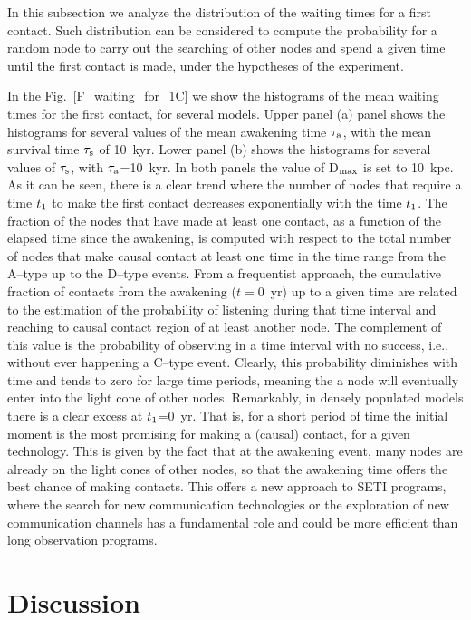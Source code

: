 \documentclass[crop]{CSLB}
\newcommand{\ceti}{node}
\newcommand{\cetis}{nodes}
\newcommand{\ffn}[1]{}
\begin{document}
In this subsection we analyze the distribution of the waiting times for
a first contact.
%
Such distribution can be considered to compute the probability for a
random \ceti{} to carry out the searching of other nodes and spend a given time until
the first contact is made, under the hypotheses of the experiment.
%
\ffn{6}
%
In the Fig.~\ref{F_waiting_for_1C} we show the histograms of the mean
waiting times for the first contact, for several models.
%
Upper panel (a) panel shows the histograms for several values of the
mean awakening time $\tau_{\rm a}$, with the mean survival time $\tau_{\rm
s}$ of 10~kyr.
%
Lower panel (b) shows the histograms for several values of $\tau_{\rm s}$,
with $\tau_{\rm a}$=10~kyr.
%
In both panels the value of D$_{\rm max}$ is set to 10~kpc.
%
As it can be seen, there is a clear trend where the number of nodes
that require a time $t_{\rm 1}$ to make the first contact 
decreases exponentially with the time $t_{\rm 1}$.
%
The fraction of the \cetis{} that have made at least one contact, as a
function of the elapsed time since the awakening, is computed with
respect to the total number of nodes that make causal contact at least
one time in the time range from the A--type up to the D--type events.
%
From a frequentist approach, the cumulative fraction of contacts from
the awakening ($t=$0~yr) up to a given time are related to the
estimation of the probability of listening during that time interval
and reaching to causal contact region of at least another node.
%
The complement of this value is the probability of observing in a time
interval with no success, i.e., without ever happening a C--type
event.
%
Clearly, this probability diminishes with time and tends to zero for
large time periods, meaning the a \ceti{} will eventually enter into
the light cone of other \cetis{}.
%
Remarkably, in densely populated models there is a clear excess at
$t_{\rm 1}$=0~yr.
%
That is, for a short period of time the initial moment is the most
promising for making a (causal) contact, for a given technology.
%
This is given by the fact that at the awakening event, many nodes are
already on the light cones of other nodes, so that the awakening time
offers the best chance of making contacts.
%
This offers a new approach to SETI programs, where the search for new
communication technologies or the exploration of new communication
channels has a fundamental role and could be more efficient than long
observation programs.




\section{Discussion}\label{S_discussion}
\end{document}
